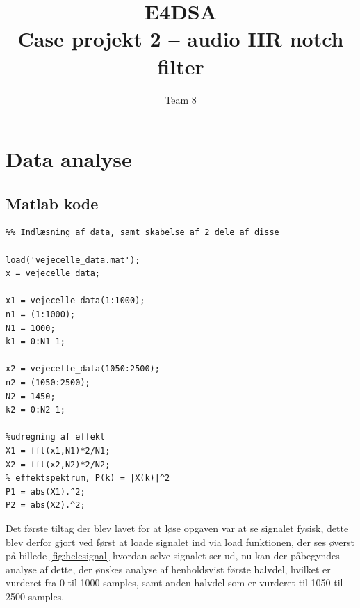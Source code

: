 \documentclass{article}
\title{E4DSA\\ Case projekt 2 – audio IIR notch filter}
\author{Team 8}
\begin{document}
\maketitle
\tableofcontents
\newpage

\section{Data analyse}
\label{sec:Data analyse}

\subsection{Matlab kode}
\label{sec:matlab1}

\begin{lstlisting}
%% Indlæsning af data, samt skabelse af 2 dele af disse

load('vejecelle_data.mat');
x = vejecelle_data;

x1 = vejecelle_data(1:1000);
n1 = (1:1000);
N1 = 1000;
k1 = 0:N1-1;

x2 = vejecelle_data(1050:2500);
n2 = (1050:2500);
N2 = 1450;
k2 = 0:N2-1;

%udregning af effekt
X1 = fft(x1,N1)*2/N1; 
X2 = fft(x2,N2)*2/N2; 
% effektspektrum, P(k) = |X(k)|^2
P1 = abs(X1).^2;
P2 = abs(X2).^2;
\end{lstlisting}

Det første tiltag der blev lavet for at løse opgaven var at se signalet fysisk, dette blev derfor gjort ved først at loade signalet ind via load funktionen, der ses øverst  på billede \ref{fig:helesignal} hvordan selve signalet ser ud, nu kan der påbegyndes analyse af dette, der ønskes analyse af henholdsvist første halvdel, hvilket er vurderet fra 0 til 1000 samples, samt anden halvdel som er vurderet til 1050 til 2500 samples.
\end{document}
